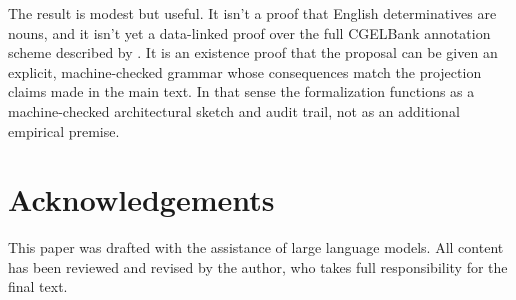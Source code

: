 \documentclass[12pt]{article}
\begin{document}
The result is modest but useful. It isn't a proof that English determinatives are nouns, and it isn't yet a data-linked proof over the full CGELBank annotation scheme described by \textcite{reynolds2025cgelbankmanual}. It is an existence proof that the proposal can be given an explicit, machine-checked grammar whose consequences match the projection claims made in the main text. In that sense the formalization functions as a machine-checked architectural sketch and audit trail, not as an additional empirical premise.

\section*{Acknowledgements}

This paper was drafted with the assistance of large language models. All content has been reviewed and revised by the author, who takes full responsibility for the final text.

\newpage
\printbibliography
\end{document}
